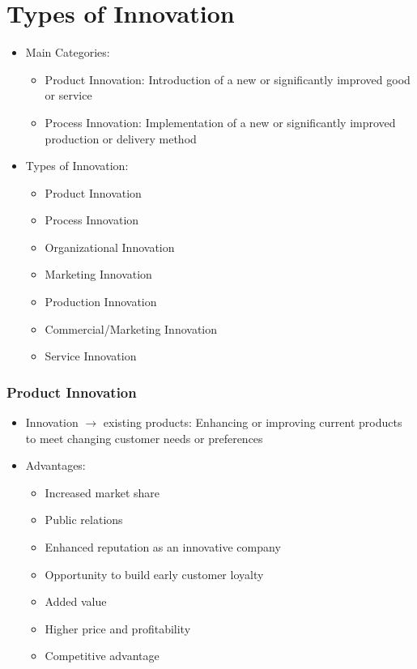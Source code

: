 \documentclass[openany,12pt,a4paper]{book}
\begin{document}
\section{Types of Innovation}
\begin{itemize}
    \item Main Categories:
    \begin{itemize}
        \item Product Innovation: Introduction of a new or significantly improved good or service
        \item Process Innovation: Implementation of a new or significantly improved production or delivery method
    \end{itemize}
    \item Types of Innovation:
    \begin{itemize}
        \item Product Innovation
        \item Process Innovation
        \item Organizational Innovation
        \item Marketing Innovation
        \item Production Innovation
        \item Commercial/Marketing Innovation
        \item Service Innovation
    \end{itemize}
\end{itemize}

\subsubsection{Product Innovation}
\begin{itemize}
    \item Innovation $\to$ existing products: Enhancing or improving current products to meet changing customer needs or preferences
    \item Advantages:
    \begin{itemize}
        \item Increased market share
        \item Public relations
        \item Enhanced reputation as an innovative company
        \item Opportunity to build early customer loyalty
        \item Added value
        \item Higher price and profitability
        \item Competitive advantage
    \end{itemize}
\end{itemize}
\end{document}

